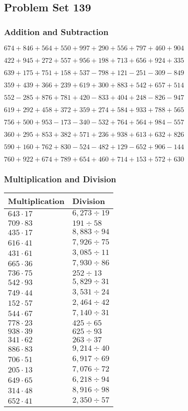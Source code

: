 \hypertarget{problem-set-139}{%
\subsection{Problem Set 139}\label{problem-set-139}}

\hypertarget{addition-and-subtraction}{%
\subsubsection{Addition and
Subtraction}\label{addition-and-subtraction}}

\(674 +846 +564 +550 +997 +290 +556 +797 +460 +904\)

\(422 +945 +272 +557 +956 +198 +713 +656 +924 +335\)

\(639 +175 +751 +158 +537 - 798 +121 - 251 - 309 - 849\)

\(359 +439 +366 +239 +619 +300 +883 +542 +657 +514\)

\(552 - 285 +876 +781 +420 - 833 +404 +248 - 826 - 947\)

\(619 +292 +458 +372 +359 +274 +584 +933 +788 +565\)

\(756 +500 +953 - 173 - 340 - 532 +764 +564 +984 - 557\)

\(360 +295 +853 +382 +571 +236 +938 +613 +632 +826\)

\(590 +160 +762 +830 - 524 - 482 +129 - 652 +906 - 144\)

\(760 +922 +674 +789 +654 +460 +714 +153 +572 +630\)

\hypertarget{multiplication-and-division}{%
\subsubsection{Multiplication and
Division}\label{multiplication-and-division}}

\begin{longtable}[]{@{}ll@{}}
\toprule
Multiplication & Division\tabularnewline
\midrule
\endhead
\(643 \cdot 17\) & \(6,273÷19\)\tabularnewline
\(709 \cdot 83\) & \(191÷58\)\tabularnewline
\(435 \cdot 17\) & \(8,883÷94\)\tabularnewline
\(616 \cdot 41\) & \(7,926÷75\)\tabularnewline
\(431 \cdot 61\) & \(3,085÷11\)\tabularnewline
\(665 \cdot 36\) & \(7,930÷86\)\tabularnewline
\(736 \cdot 75\) & \(252÷13\)\tabularnewline
\(542 \cdot 93\) & \(5,829÷31\)\tabularnewline
\(749 \cdot 44\) & \(3,531÷24\)\tabularnewline
\(152 \cdot 57\) & \(2,464÷42\)\tabularnewline
\(544 \cdot 67\) & \(7,140÷31\)\tabularnewline
\(778 \cdot 23\) & \(425÷65\)\tabularnewline
\(938 \cdot 39\) & \(625÷93\)\tabularnewline
\(341 \cdot 62\) & \(263÷37\)\tabularnewline
\(886 \cdot 83\) & \(9,214÷40\)\tabularnewline
\(706 \cdot 51\) & \(6,917÷69\)\tabularnewline
\(205 \cdot 13\) & \(7,076÷72\)\tabularnewline
\(649 \cdot 65\) & \(6,218÷94\)\tabularnewline
\(314 \cdot 48\) & \(8,916÷98\)\tabularnewline
\(652 \cdot 41\) & \(2,350÷57\)\tabularnewline
\bottomrule
\end{longtable}
